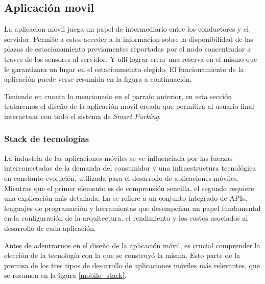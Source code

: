 \clearpage

\subsection{Aplicación movil}

La aplicacion movil juega un papel de intermediario entre los conductores y el servidor. Permite a estos acceder a la informacion sobre la disponibilidad de las plazas de estacionamiento previamentes reportadas por el nodo concentrador a traves de los sensores al servidor. Y alli lograr crear una reserva en el mismo que le garantizara un lugar en el estacionmeinto elegido. El funcionamiento de la aplicación puede verse resumida en la figura a continuación.


Teniendo en cuanta lo mencionado en el parrafo anterior, en esta sección trataremos el diseño de la aplicación movil creada que permitira al usuario final interactuar con todo el sistema de \textit{Smart Parking}.

\subsubsection{Stack de tecnologías}
La industria de las aplicaciones móviles se ve influenciada por las fuerzas interconectadas de la demanda del consumidor y una infraestructura tecnológica en constante evolución, utilizada para el desarrollo de aplicaciones móviles. Mientras que el primer elemento es de comprensión sencilla, el segundo requiere una explicación más detallada. La  se refiere a un conjunto integrado de APIs, lenguajes de programación y herramientas que desempeñan un papel fundamental en la configuración de la arquitectura, el rendimiento y los costos asociados al desarrollo de cada aplicación.

Antes de adentrarnos en el diseño de la aplicación móvil, es crucial comprender la elección de la tecnología con la que se construyó la misma. Esto parte de la premisa de los tres tipos de desarrollo de aplicaciones móviles más relevantes, que se resumen en la figura \ref{mobile_stack}.


